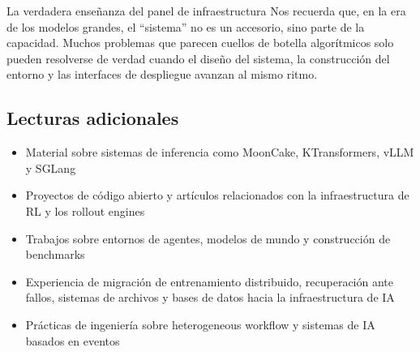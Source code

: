 \begin{importantbox}{La verdadera enseñanza del panel de infraestructura}
Nos recuerda que, en la era de los modelos grandes, el ``sistema'' no es un accesorio, sino parte de la capacidad. Muchos problemas que parecen cuellos de botella algorítmicos solo pueden resolverse de verdad cuando el diseño del sistema, la construcción del entorno y las interfaces de despliegue avanzan al mismo ritmo.
\end{importantbox}

\subsection{Lecturas adicionales}
\begin{itemize}
  \item Material sobre sistemas de inferencia como MoonCake, KTransformers, vLLM y SGLang
  \item Proyectos de código abierto y artículos relacionados con la infraestructura de RL y los rollout engines
  \item Trabajos sobre entornos de agentes, modelos de mundo y construcción de benchmarks
  \item Experiencia de migración de entrenamiento distribuido, recuperación ante fallos, sistemas de archivos y bases de datos hacia la infraestructura de IA
  \item Prácticas de ingeniería sobre heterogeneous workflow y sistemas de IA basados en eventos
\end{itemize}


